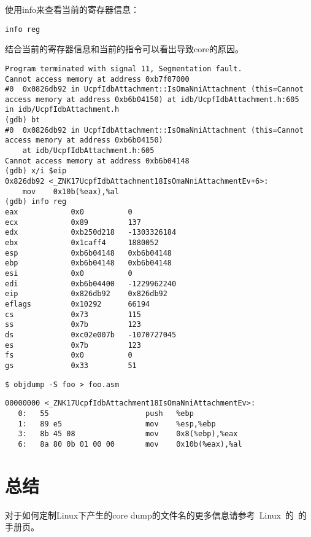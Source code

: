 使用info来查看当前的寄存器信息：\\
\begin{lstlisting}
info reg
\end{lstlisting}

结合当前的寄存器信息和当前的指令可以看出导致core的原因。

\begin{lstlisting}
Program terminated with signal 11, Segmentation fault.
Cannot access memory at address 0xb7f07000
#0  0x0826db92 in UcpfIdbAttachment::IsOmaNniAttachment (this=Cannot access memory at address 0xb6b04150) at idb/UcpfIdbAttachment.h:605
in idb/UcpfIdbAttachment.h
(gdb) bt
#0  0x0826db92 in UcpfIdbAttachment::IsOmaNniAttachment (this=Cannot access memory at address 0xb6b04150)
    at idb/UcpfIdbAttachment.h:605
Cannot access memory at address 0xb6b04148
(gdb) x/i $eip
0x826db92 <_ZNK17UcpfIdbAttachment18IsOmaNniAttachmentEv+6>:
    mov    0x10b(%eax),%al
(gdb) info reg
eax            0x0          0
ecx            0x89         137
edx            0xb250d218   -1303326184
ebx            0x1caff4     1880052
esp            0xb6b04148   0xb6b04148
ebp            0xb6b04148   0xb6b04148
esi            0x0          0
edi            0xb6b04400   -1229962240
eip            0x826db92    0x826db92
eflags         0x10292      66194
cs             0x73         115
ss             0x7b         123
ds             0xc02e007b   -1070727045
es             0x7b         123
fs             0x0          0
gs             0x33         51
\end{lstlisting}

\begin{lstlisting}
$ objdump -S foo > foo.asm
\end{lstlisting}

\begin{lstlisting}
00000000 <_ZNK17UcpfIdbAttachment18IsOmaNniAttachmentEv>:
   0:   55                      push   %ebp
   1:   89 e5                   mov    %esp,%ebp
   3:   8b 45 08                mov    0x8(%ebp),%eax
   6:   8a 80 0b 01 00 00       mov    0x10b(%eax),%al
\end{lstlisting}


\section{总结}

对于如何定制Linux下产生的core dump的文件名的更多信息请参考~Linux~的~的手册页。
